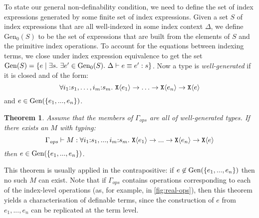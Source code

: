\documentclass{sigplanconf}
\newcommand{\sepbar}{\mathrel|}
\newcommand{\tyPrim}[2]{\textup{\texttt{#1}}\langle #2 \rangle}
\newtheorem{theorem}{Theorem}
\theoremstyle{examplestyle}
\theoremstyle{restatementstyle}
\begin{document}
To state our general non-definability condition, we need to define the
set of index expressions generated by some finite set of index
expressions. Given a set $S$ of index expressions that are all
well-indexed in some index context $\Delta$, we define
$\mathrm{Gen}_0(S)$ to be the set of expressions that are built from
the elements of $S$ and the primitive index operations. To account for
the equations between indexing terms, we close under index expression
equivalence to get the set $\Gen(S) = \{ e \sepbar \exists s.\ \exists
e' \in \mathrm{Gen}_0(S).\ \Delta \vdash e \equiv e' : s \}$. Now a
type is \emph{well-generated} if it is closed and of the form:
\begin{displaymath}
  \forall i_1\mathord:s_1,\ldots,i_m\mathord:s_m.~\tyPrim{X}{e_1} \to \ldots \to \tyPrim{X}{e_n} \to \tyPrim{X}{e}
\end{displaymath}
and $e \in \mathrm{Gen}(\{e_1,...,e_n\})$.
\begin{theorem}\label{thm:general-nondef}
  Assume that the members of $\Gamma_{\mathit{ops}}$ are all of
  well-generated types. If there exists an $M$ with typing:
  \begin{displaymath}
    \Gamma_{\mathit{ops}} \vdash M : \forall i_1\mathord:s_1,...,i_m\mathord:s_m.~\tyPrim{X}{e_1} \to ... \to \tyPrim{X}{e_n} \to \tyPrim{X}{e}
  \end{displaymath}
  then $e \in \mathrm{Gen}(\{e_1,...,e_n\})$.
\end{theorem}
This theorem is usually applied in the contrapositive: if $e \not\in
\mathrm{Gen}(\{e_1,...,e_n\})$ then no such $M$ can exist. Note that if
$\Gamma_{\mathit{ops}}$ contains operations corresponding to each of
the index-level operations (as, for example, in
\autoref{fig:real-ops}), then this theorem yields a characterisation
of definable terms, since the construction of $e$ from $e_1,...,e_n$
can be replicated at the term level.
\end{document}
